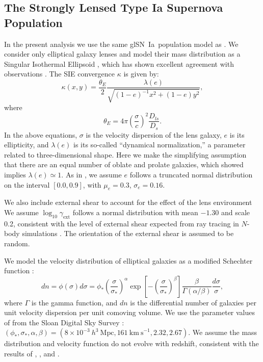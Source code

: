 \documentclass[iop,apj,numberedappendix,twocolappendix]{emulateapj}
\newcommand{\snia}{{\rm SN~Ia}}
\newcommand{\kms}{\ensuremath{\mathrm{km~s}^{-1}}}
\begin{document}
\subsection{The Strongly Lensed Type Ia Supernova Population}
\label{sec:population}
In the present analysis we use the same gl\snia\ population model as \cite{gn17}.
We consider only elliptical galaxy lenses and model their mass distribution as a Singular Isothermal Ellipsoid \cite[SIE;][]{kormann94}, which has shown excellent agreement with observations \citep[e.g.,][]{koopmans09}.
The SIE convergence $\kappa$ is given by:
\begin{equation}
\label{eq:sie}
\kappa(x,y) = \frac{\theta_{E}}{2}
	\frac{\lambda(e)}{\sqrt{(1-e)^{-1}x^2+(1-e)y^2}},
\end{equation}
where
\begin{equation}
\label{eq:einrad}
\theta_{E} = 4 \pi \left(\frac{\sigma}{c}\right)^2\frac{D_{ls}}{D_s}.
\end{equation} 
In the above equations, $\sigma$ is the velocity dispersion of the lens galaxy, $e$ is its ellipticity, and $\lambda(e)$ is its so-called ``dynamical normalization,'' a parameter related to three-dimensional shape.
Here we make the simplifying assumption that there are an equal number of oblate and prolate galaxies, which \cite{chae03} showed implies $\lambda(e) \simeq 1$. 
As in \cite{oguri08}, we assume $e$ follows a truncated normal distribution on the interval $[0.0, 0.9]$, with $\mu_e= 0.3$, $\sigma_e = 0.16$. 

We also include external shear to account for the effect of the lens environment \citep[e.g.,][]{kochanek91, keeton97, witt97}
We assume $\log_{10}\gamma_\mathrm{ext}$ follows a normal distribution with mean $-1.30$ and scale 0.2, consistent with the level of external shear expected from ray tracing in $N$-body simulations \citep{holder03}.
The orientation of the external shear is assumed to be random.

We model the velocity distribution of elliptical galaxies as a modified Schechter function \citep{sheth03}:
\begin{equation}
\label{eq:schechter}
dn = \phi(\sigma) d\sigma = \phi_*\left(\frac{\sigma}{\sigma_*}\right)^\alpha \exp\left[-\left(\frac{\sigma}{\sigma_*}\right)^\beta\right]\frac{\beta}{\Gamma(\alpha/\beta)}\frac{d\sigma}{\sigma},
\end{equation}
where $\Gamma$ is the gamma function, and $dn$ is the differential number of galaxies per unit velocity dispersion per unit comoving volume.
We use the parameter values of \cite{choi07} from the Sloan Digital Sky Survey \citep[SDSS;][]{sdss}:
$(\phi_*, \sigma_*, \alpha, \beta) = (8 \times 10^{-3}~h^3~\mathrm{Mpc}, 161~\kms,2.32, 2.67)$.
We assume the mass distribution and velocity function do not evolve with redshift, consistent with the results of \cite{chae07}, \cite{oguri08}, and \cite{bezanson11}. 
\end{document}
